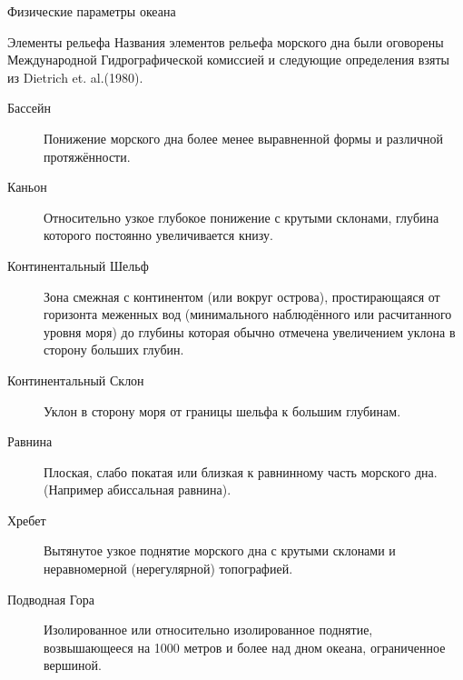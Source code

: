 \begin{chapter}{Физические параметры океана}
\begin{section}{Элементы рельефа}
Названия элементов рельефа морского дна были оговорены Международной
Гидрографической комиссией и следующие определения взяты из Dietrich
et. al.(1980).

\begin{description}
\item[Бассейн] 
Понижение морского дна более менее выравненной формы и различной
протяжённости.
%

\item[Каньон]
Относительно узкое глубокое понижение с крутыми склонами, глубина
которого постоянно увеличивается книзу.
%

\item[Континентальный Шельф]
Зона смежная с континентом (или вокруг острова), простирающаяся от
горизонта меженных вод (минимального наблюдённого или расчитанного
уровня моря) до глубины которая обычно отмечена увеличением уклона в
сторону больших глубин.
%
 
\item[Континентальный Склон]
Уклон в сторону моря от границы шельфа к большим глубинам.
%

\item[Равнина]
Плоская, слабо покатая или близкая к равнинному часть морского
дна. (Например абиссальная равнина).
%

\item[Хребет]
Вытянутое узкое поднятие морского дна с крутыми склонами и
неравномерной (нерегулярной) топографией.
%

\item[Подводная Гора]
Изолированное или относительно изолированное поднятие, возвышающееся
на 1000 метров и более над дном океана, ограниченное вершиной.
%


\end{description}
\end{section}
\end{chapter}
